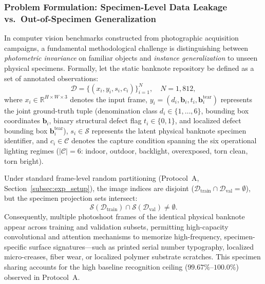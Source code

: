 \documentclass[final,5p,times,twocolumn,authoryear]{elsarticle}
\begin{document}
\subsubsection{Problem Formulation: Specimen-Level Data Leakage vs.\ Out-of-Specimen Generalization}
In computer vision benchmarks constructed from photographic acquisition campaigns, a fundamental methodological challenge is distinguishing between \textit{photometric invariance} on familiar objects and \textit{instance generalization} to unseen physical specimens. Formally, let the static banknote repository be defined as a set of annotated observations:
\begin{equation}
\mathcal{D} = \big\{(x_i, y_i, s_i, c_i)\big\}_{i=1}^{N}, \quad N = 1{,}812,
\end{equation}
where $x_i \in \mathbb{R}^{H \times W \times 3}$ denotes the input frame, $y_i = (d_i, \mathbf{b}_i, t_i, \mathbf{b}^{\text{tear}}_i)$ represents the joint ground-truth tuple (denomination class $d_i \in \{1,\dots,6\}$, bounding box coordinates $\mathbf{b}_i$, binary structural defect flag $t_i \in \{0, 1\}$, and localized defect bounding box $\mathbf{b}^{\text{tear}}_i$), $s_i \in \mathcal{S}$ represents the latent physical banknote specimen identifier, and $c_i \in \mathcal{C}$ denotes the capture condition spanning the six operational lighting regimes ($|\mathcal{C}| = 6$: indoor, outdoor, backlight, overexposed, torn clean, torn bright).

Under standard frame-level random partitioning (Protocol~A, Section~\ref{subsec:exp_setup}), the image indices are disjoint ($\mathcal{D}_{\text{train}} \cap \mathcal{D}_{\text{val}} = \emptyset$), but the specimen projection sets intersect:
\begin{equation}
\mathcal{S}(\mathcal{D}_{\text{train}}) \cap \mathcal{S}(\mathcal{D}_{\text{val}}) \neq \emptyset.
\end{equation}
Consequently, multiple photoshoot frames of the identical physical banknote appear across training and validation subsets, permitting high-capacity convolutional and attention mechanisms to memorize high-frequency, specimen-specific surface signatures---such as printed serial number typography, localized micro-creases, fiber wear, or localized polymer substrate scratches. This specimen sharing accounts for the high baseline recognition ceiling ($99.67\%$--$100.0\%$) observed in Protocol~A. 
\end{document}
